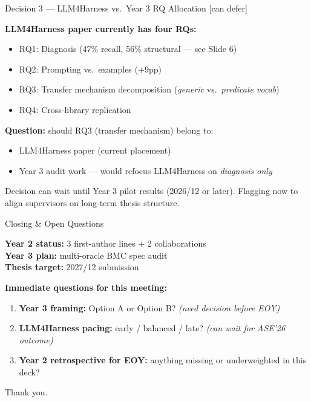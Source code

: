 \documentclass[aspectratio=169]{beamer}
\begin{document}
\begin{frame}{Decision 3 --- LLM4Harness vs.\ Year 3 RQ Allocation
\quad\textcolor{mygray}{\small[can defer]}}

\textbf{LLM4Harness paper currently has four RQs:}
\begin{itemize}\small
  \item RQ1: Diagnosis (47\% recall, 56\% structural \textcolor{mygray}{--- see Slide 6})
  \item RQ2: Prompting vs.\ examples ($+$9pp)
  \item RQ3: Transfer mechanism decomposition (\emph{generic} vs.\ \emph{predicate vocab})
  \item RQ4: Cross-library replication
\end{itemize}

\bigskip
\textbf{Question:} should RQ3 (transfer mechanism) belong to:
\begin{itemize}\small
  \item[(a)] LLM4Harness paper (current placement)
  \item[(b)] Year 3 audit work --- would refocus LLM4Harness on \emph{diagnosis only}
\end{itemize}

\bigskip
{\small\color{mygray}
Decision can wait until Year 3 pilot results (2026/12 or later).
Flagging now to align supervisors on long-term thesis structure.}

\end{frame}

\begin{frame}{Closing \& Open Questions}

\textbf{Year 2 status:} 3 first-author lines $+$ 2 collaborations\\
\textbf{Year 3 plan:} multi-oracle BMC spec audit\\
\textbf{Thesis target:} 2027/12 submission

\bigskip
\textbf{Immediate questions for this meeting:}
\begin{enumerate}\small
  \item \textbf{Year 3 framing:} Option A or Option B?
        \emph{(need decision before EOY)}
  \item \textbf{LLM4Harness pacing:} early / balanced / late?
        \emph{(can wait for ASE'26 outcome)}
  \item \textbf{Year 2 retrospective for EOY:} anything missing or
        underweighted in this deck?
\end{enumerate}

\bigskip
\begin{center}
{\large Thank you.}
\end{center}

\end{frame}
\end{document}
